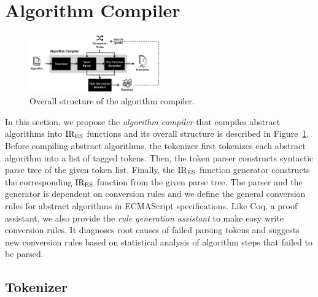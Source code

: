 \section{Algorithm Compiler}

\begin{figure}
  \centering
  \includegraphics[width=0.5\textwidth]{img/algo_compiler.png}
  \caption{Overall structure of the algorithm compiler.}
  \label{fig:algo-compiler}
\end{figure}

In this section, we propose the \textit{algorithm compiler}
that compiles abstract algorithms into \( \text{IR}_\text{ES} \) functions
and its overall structure is described in Figure~\ref{fig:algo-compiler}.
Before compiling abstract algorithms,
the tokenizer first tokenizes each abstract algorithm into
a list of tagged tokens. Then, the token parser constructs
syntactic parse tree of the given token list.
Finally, the \( \text{IR}_\text{ES} \) function generator constructs the corresponding
\( \text{IR}_\text{ES} \) function from the given parse tree.
The parser and the generator is dependent on conversion rules
and we define the general conversion rules for abstract algorithms in
ECMAScript specifications. Like Coq, a proof assistant, we also provide
the \textit{rule generation assistant} to make easy write conversion rules.
It diagnoses root causes of failed parsing tokens
and suggests new conversion rules based on
statistical analysis of algorithm steps that failed to be parsed.

\subsection{Tokenizer}

